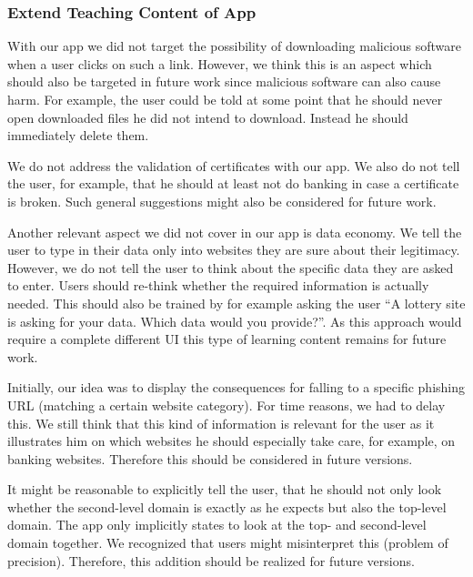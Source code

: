 \subsubsection{Extend Teaching Content of App}
\begin{description}[leftmargin=0cm]
\item[Malicious Downloads:] With our app we did not target the possibility of downloading malicious software when a user clicks on such a link.
	However, we think this is an aspect which should also be targeted in future work since malicious software can also cause harm.
	For example, the user could be told at some point that he should never open downloaded files he did not intend to download.
	Instead he should immediately delete them.
	\item[Certificate Validation:] We do not address the validation of certificates with our app. We also do not tell the user, for example, that he should at least not do banking in case a certificate is broken.
	Such general suggestions might also be considered for future work.
	\item[Data Economy:] Another relevant aspect we did not cover in our app is data economy.
	We tell the user to type in their data only into websites they are sure about their legitimacy.
	However, we do not tell the user to think about the specific data they are asked to enter.
	Users should re-think whether the required information is actually needed.
	This should also be trained by for example asking the user ``A lottery site is asking for your data. Which data would you provide?''. As this approach would require a complete different UI this type of learning content remains for future work.
	\item[Consequences:] Initially, our idea was to display the consequences for falling to a specific phishing URL (matching a certain website category). For time reasons, we had to delay this.
	We still think that this kind of information is relevant for the user as it illustrates him on which websites he should especially take care, for example, on banking websites. Therefore this should be considered in future versions.
	\item[Top-Level Domain Attacks:] It might be reasonable to explicitly tell the user, that he should not only look whether the second-level domain is exactly as he expects but also the top-level domain. The app only implicitly states to look at the top- and second-level domain together.
We recognized that users might misinterpret this (problem of precision).
Therefore, this addition should be realized for future versions.

\end{description}
